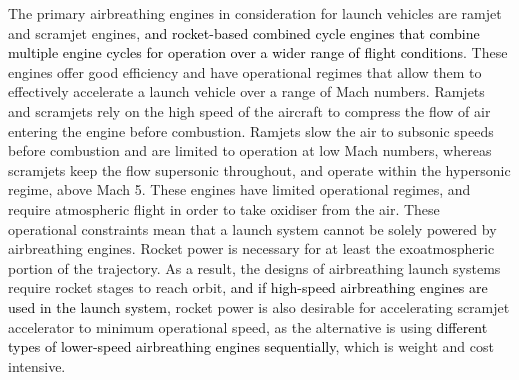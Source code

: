   	The primary airbreathing engines in consideration for launch vehicles are ramjet and scramjet engines, \textcolor{black}{and rocket-based combined cycle engines that combine multiple engine cycles for operation over a wider range of flight conditions}\cite{HeiserWilliamPratt1994,Kors1988}. These engines offer good efficiency and have operational regimes that allow them to effectively accelerate a launch vehicle over a range of Mach numbers. 
  	Ramjets and scramjets rely on the high speed of the aircraft to compress the flow of air entering the engine before combustion.  Ramjets slow the air to subsonic speeds before combustion and are limited to operation at low Mach numbers, whereas scramjets keep the flow supersonic throughout, and operate within the hypersonic regime, above Mach 5. 
  	These engines have limited operational regimes, and require atmospheric flight in order to take oxidiser from the air. These operational constraints mean that a launch system cannot be solely powered by airbreathing engines. Rocket power is necessary for at least the exoatmospheric portion of the trajectory. As a result, the designs of airbreathing launch systems require rocket stages to reach orbit\cite{Smart2009a}, \textcolor{black}{and if high-speed airbreathing engines are used in the launch system}, rocket power is also desirable for accelerating scramjet accelerator to minimum operational speed, as the alternative is using \textcolor{black}{different types of lower-speed airbreathing engines sequentially}\cite{Smart2009a}, which is weight and cost intensive. 
  	
